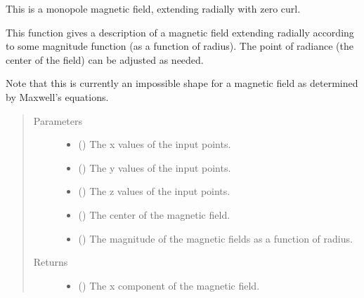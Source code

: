 \documentclass[letterpaper,10pt,english]{sphinxmanual}
\begin{document}
\begin{fulllineitems}
\label{\detokenize{magnetic_field_functions_3d:magnetic_field_functions_3d.monopole_magnetic_field_cart_3d}}
This is a monopole magnetic field, extending radially with zero curl.

This function gives a description of a magnetic field extending radially
according to some magnitude function (as a function of radius). The
point of radiance (the center of the field) can be adjusted as needed.

Note that this is currently an impossible shape for a magnetic field as
determined by Maxwell’s equations.
\begin{quote}\begin{description}
\item[{Parameters}] \leavevmode\begin{itemize}
\item {} 
 () \textendash{} The x values of the input points.

\item {} 
 () \textendash{} The y values of the input points.

\item {} 
 () \textendash{} The z values of the input points.

\item {} 
 () \textendash{} The center of the magnetic field.

\item {} 
 () \textendash{} The magnitude of the magnetic fields as a function of radius.

\end{itemize}

\item[{Returns}] \leavevmode
\begin{itemize}
\item {} 
 () \textendash{} The x component of the magnetic field.


\end{itemize}
\end{description}
\end{quote}
\end{fulllineitems}
\end{document}
